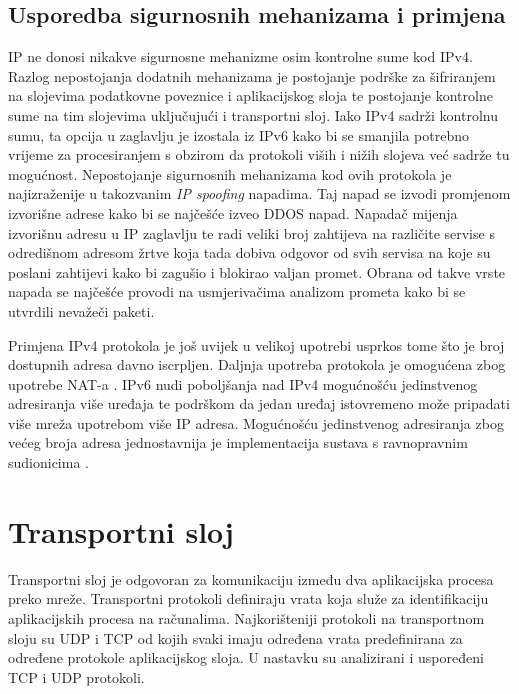 \documentclass[times, utf8, diplomski]{fer}
\begin{document}
\subsection{Usporedba sigurnosnih mehanizama i primjena}
IP ne donosi nikakve sigurnosne mehanizme osim kontrolne sume kod IPv4. Razlog nepostojanja dodatnih mehanizama je postojanje podrške za šifriranjem na slojevima podatkovne poveznice i aplikacijskog sloja te postojanje kontrolne sume na tim slojevima uključujući i transportni sloj. Iako IPv4 sadrži kontrolnu sumu, ta opcija u zaglavlju je izostala iz IPv6 kako bi se smanjila potrebno vrijeme za procesiranjem s obzirom da protokoli viših i nižih slojeva već sadrže tu mogućnost. Nepostojanje sigurnosnih mehanizama kod ovih protokola je najizraženije u takozvanim \emph{IP spoofing} napadima. Taj napad se izvodi promjenom izvorišne adrese kako bi se najčešće izveo DDOS  napad. Napadač mijenja izvorišnu adresu u IP zaglavlju te radi veliki broj zahtijeva na različite servise s odredišnom adresom žrtve koja tada dobiva odgovor od svih servisa na koje su poslani zahtijevi kako bi zagušio i blokirao valjan promet. Obrana od takve vrste napada se najčešće provodi na usmjerivačima analizom prometa kako bi se utvrdili nevažeči paketi. 

Primjena IPv4 protokola je još uvijek u velikoj upotrebi usprkos tome što je broj dostupnih adresa davno iscrpljen. Daljnja upotreba protokola je omogućena zbog upotrebe NAT-a . IPv6 nudi poboljšanja nad IPv4 mogućnošću jedinstvenog adresiranja više uređaja te podrškom da jedan uređaj istovremeno može pripadati više mreža upotrebom više IP adresa. Mogućnošću jedinstvenog adresiranja zbog većeg broja adresa jednostavnija je implementacija sustava s ravnopravnim sudionicima .

\section{Transportni sloj}
Transportni sloj je odgovoran za komunikaciju između dva aplikacijska procesa preko mreže. Transportni protokoli definiraju vrata  koja služe za identifikaciju aplikacijskih procesa na računalima. Najkorišteniji protokoli na transportnom sloju su UDP  i TCP  od kojih svaki imaju određena vrata predefinirana za određene protokole aplikacijskog sloja. U nastavku su analizirani i uspoređeni TCP i UDP protokoli.
\end{document}
